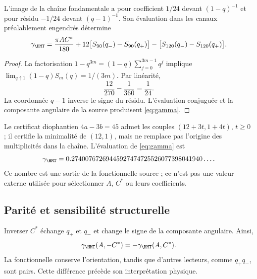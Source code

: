 \begin{theorem}
L'image de la chaîne fondamentale a pour coefficient $1/24$
devant $(1-q)^{-1}$ et pour résidu $-1/24$ devant $(q-1)^{-1}$.
Son évaluation dans les canaux préalablement engendrés détermine
\begin{equation}
\gamma_{\HMT}=
\frac{\pi AC^*}{180}
+12\bigl[S_{90}(q_-)-S_{90}(q_+)\bigr]
-\bigl[S_{120}(q_-)-S_{120}(q_+)\bigr].
\label{eq:gamma}
\end{equation}
\end{theorem}
\begin{proof}
La factorisation $1-q^{3m}=(1-q)\sum_{j=0}^{3m-1}q^j$ implique
$\lim_{q\uparrow1}(1-q)S_m(q)=1/(3m)$. Par linéarité,
\[
\frac{12}{270}-\frac1{360}=\frac1{24}.
\]
La coordonnée $q-1$ inverse le signe du résidu.
L'évaluation conjuguée et la composante angulaire de la source
produisent \eqref{eq:gamma}.
\end{proof}

Le certificat diophantien $4a-3b=45$ admet les couples
$(12+3t,1+4t)$, $t\ge0$ ; il certifie la minimalité de $(12,1)$,
mais ne remplace pas l'origine des multiplicités dans la chaîne.
L'évaluation de \eqref{eq:gamma} est
\[
\gamma_{\HMT}
=0.27400767269445927474725526077398041940\ldots.
\]
Ce nombre est une sortie de la fonctionnelle source ; ce n'est pas une valeur externe
utilisée pour sélectionner $A$, $C^*$ ou leurs coefficients.

\subsection{Parité et sensibilité structurelle}
Inverser $C^*$ échange $q_+$ et $q_-$ et change le signe
de la composante angulaire. Ainsi,
\[
\gamma_{\HMT}(A,-C^*)=-\gamma_{\HMT}(A,C^*).
\]
La fonctionnelle conserve l'orientation, tandis que d'autres lecteurs,
comme $q_+q_-$, sont pairs. Cette différence précède son interprétation physique.
